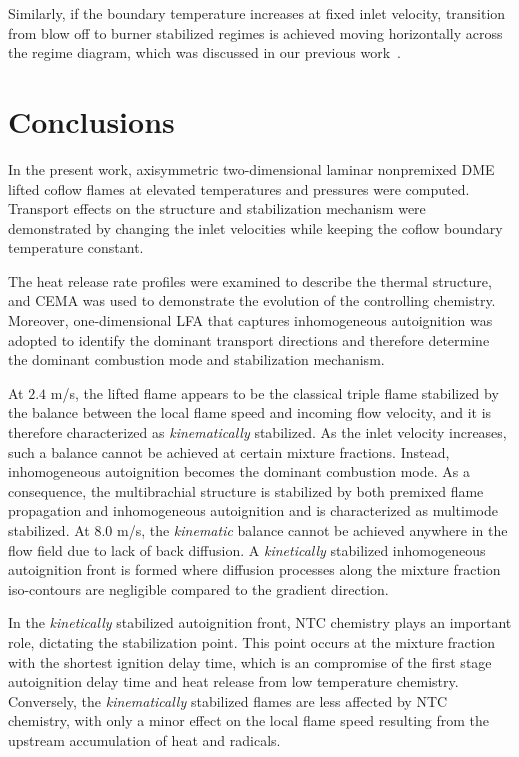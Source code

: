 \documentclass[review,3p,times]{elsarticle}
\begin{document}
Similarly, if the boundary temperature increases at fixed inlet velocity, transition from blow off to burner stabilized regimes is achieved moving horizontally across the regime diagram, which was discussed in our previous work~\cite{deng15}.     



\section{Conclusions}

In the present work, axisymmetric two-dimensional laminar nonpremixed DME lifted coflow flames at elevated temperatures and pressures were computed.  Transport effects on the structure and stabilization mechanism were demonstrated by changing the inlet velocities while keeping the coflow boundary temperature constant.

The heat release rate profiles were examined to describe the thermal structure, and CEMA was used to demonstrate the evolution of the controlling chemistry.  Moreover, one-dimensional LFA that captures inhomogeneous autoignition was adopted to identify the dominant transport directions and therefore determine the dominant combustion mode and stabilization mechanism.

At $2.4$ m/s, the lifted flame appears to be the classical triple flame stabilized by the balance between the local flame speed and incoming flow velocity, and it is therefore characterized as \emph {kinematically} stabilized.  As the inlet velocity increases, such a balance cannot be achieved at certain mixture fractions.  Instead, inhomogeneous autoignition becomes the dominant combustion mode.  As a consequence, the multibrachial structure is stabilized by both premixed flame propagation and inhomogeneous autoignition and is characterized as multimode stabilized.  At $8.0$ m/s, the \emph{kinematic} balance cannot be achieved anywhere in the flow field due to lack of back diffusion.  A \emph{kinetically} stabilized inhomogeneous autoignition front is formed where diffusion processes along the mixture fraction iso-contours are negligible compared to the gradient direction.

\textcolor{cm}{In the \emph{kinetically} stabilized autoignition front, NTC chemistry plays an important role, dictating the stabilization point.  This point occurs at the mixture fraction with the shortest ignition delay time, which is an compromise of the first stage autoignition delay time and heat release from low temperature chemistry.  Conversely, the \emph{kinematically} stabilized flames are less affected by NTC chemistry, with only a minor effect on the local flame speed resulting from the upstream accumulation of heat and radicals.}
\end{document}
